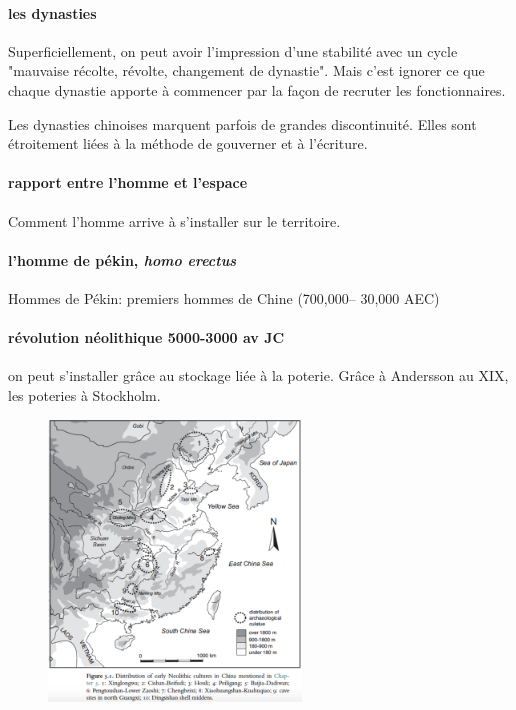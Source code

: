 \FloatBarrier

\paragraph{les dynasties} Superficiellement, on peut avoir l'impression d'une stabilité avec un cycle "mauvaise récolte, révolte, changement de dynastie". Mais c'est ignorer ce que chaque dynastie apporte à commencer par la façon de recruter les fonctionnaires.


\begin{Prop}
    Les dynasties chinoises marquent parfois de grandes discontinuité. Elles sont étroitement liées à la méthode de gouverner et à l'écriture.
\end{Prop}

\paragraph{rapport entre l'homme et l'espace} Comment l'homme arrive à s'installer sur le territoire. 

\paragraph{l'homme de pékin, \textit{homo erectus}} Hommes de Pékin: premiers hommes de Chine (700,000– 30,000 AEC)

\paragraph{révolution néolithique 5000-3000 av JC} on peut s'installer grâce au stockage liée à la poterie.
Grâce à Andersson au XIX, les poteries à Stockholm.
\begin{figure}[!h]
    \centering
\includegraphics[width=0.6\textwidth]{ConfucianismeTaoismeBouddhismeChinois/Images/NeolithiqueAncien.png}

    \label{fig:enter-label}
\end{figure}

